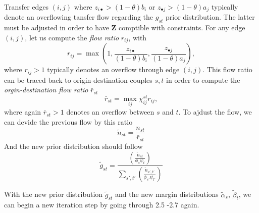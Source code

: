 \documentclass{bmcart}
\begin{document}
Transfer edges $(i, j)$ where $z_{i \bullet} > (1 - \theta)b_i$ or $z_{\bullet j} > (1 - \theta)a_j$ typically denote an overflowing tansfer flow regarding the $g_{st}$ prior distribution.  The latter must be adjusted in order to have $\mathbf{Z}$ comptible with constraints. For any edge $(i, j)$, let us compute the \emph{flow ratio} $r_{ij}$, with 
\begin{equation}
	\label{flow_ratio}
	r_{ij} = \max \left(1, \frac{z_{i \bullet}}{(1 - \theta)b_i}, \frac{z_{\bullet j}}{(1 - \theta)a_j} \right),
\end{equation}
where $r_{ij} > 1$ typically denotes an overflow through edge $(i, j)$. This flow ratio can be traced back to origin-destination couples $s, t$ in order to compute the \emph{orgin-destination flow ratio} $\bar{r}_{st}$ 
\begin{equation}
	\label{st_flow_ratio}
	\bar{r}_{st} = \max_{ij} \chi_{ij}^{st} r_{ij},
\end{equation}
where again $\bar{r}_{st} > 1$ denotes an overflow between $s$ and $t$. To ajdust the flow, we can devide the previous flow by this ratio
\begin{equation}
	\label{update_flow}
	\widetilde{n}_{st} =\frac{n_{st}}{\bar{r}_{st}}
\end{equation}
And the new prior distribution should follow 
\begin{equation}
	\label{update_distrib}
	\widetilde{g}_{st} = \frac{\left( \frac{\widetilde{n}_{st}}{\phi_s \psi_t} \right)}{\sum_{s',t'} \left( \frac{\widetilde{n}_{s',t'}}{\phi_{s'} \psi_{t'}} \right)}
\end{equation}

With the new prior distribution $\widetilde{g}_{st}$ and the new margin distributions $\widetilde{\alpha}_s$, $\widetilde{\beta}_t$, we can begin a new iteration step by going through 2.5 -2.7 again.
\end{document}
